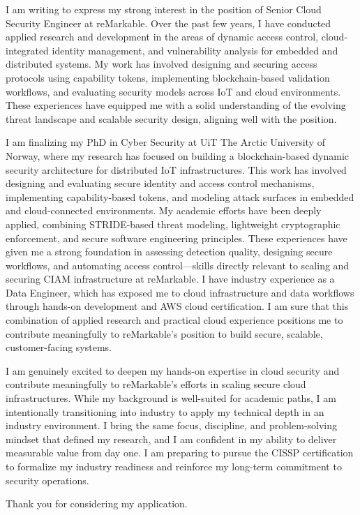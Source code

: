 I am writing to express my strong interest in the position of Senior Cloud Security Engineer at reMarkable. Over the past few years, I have conducted applied research and development in the areas of dynamic access control, cloud-integrated identity management, and vulnerability analysis for embedded and distributed systems. My work has involved designing and securing access protocols using capability tokens, implementing blockchain-based validation workflows, and evaluating security models across IoT and cloud environments. These experiences have equipped me with a solid understanding of the evolving threat landscape and scalable security design, aligning well with the position.

I am finalizing my PhD in Cyber Security at UiT The Arctic University of Norway, where my research has focused on building a blockchain-based dynamic security architecture for distributed IoT infrastructures. This work has involved designing and evaluating secure identity and access control mechanisms, implementing capability-based tokens, and modeling attack surfaces in embedded and cloud-connected environments. My academic efforts have been deeply applied, combining STRIDE-based threat modeling, lightweight cryptographic enforcement, and secure software engineering principles. These experiences have given me a strong foundation in assessing detection quality, designing secure workflows, and automating access control—skills directly relevant to scaling and securing CIAM infrastructure at reMarkable. I have industry experience as a Data Engineer, which has exposed me to cloud infrastructure and data workflows through hands-on development and AWS cloud certification. I am sure that this combination of applied research and practical cloud experience positions me to contribute meaningfully to reMarkable’s position to build secure, scalable, customer-facing systems.

I am genuinely excited to deepen my hands-on expertise in cloud security and contribute meaningfully to reMarkable’s efforts in scaling secure cloud infrastructures. While my background is well-suited for academic paths, I am intentionally transitioning into industry to apply my technical depth in an industry environment. I bring the same focus, discipline, and problem-solving mindset that defined my research, and I am confident in my ability to deliver measurable value from day one. I am preparing to pursue the CISSP certification to formalize my industry readiness and reinforce my long-term commitment to security operations.

Thank you for considering my application.
